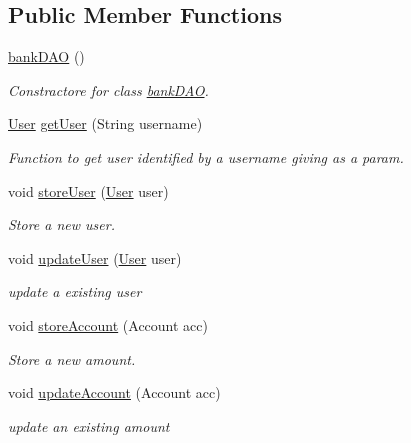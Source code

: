 \subsection*{Public Member Functions}
\begin{DoxyCompactItemize}
\item 
\mbox{\label{classbankapp_1_1server_1_1bankDAO_a974c7da6eea192fb2f94a98a66e5068a}} 
\hyperlink{classbankapp_1_1server_1_1bankDAO_a974c7da6eea192fb2f94a98a66e5068a}{bank\+D\+AO} ()
\begin{DoxyCompactList}\small\item\em Constractore for class \hyperlink{classbankapp_1_1server_1_1bankDAO}{bank\+D\+AO}. \end{DoxyCompactList}\item 
\hyperlink{classbankapp_1_1server_1_1User}{User} \hyperlink{classbankapp_1_1server_1_1bankDAO_af952db62263ca6ebda3130336e63f941}{get\+User} (String username)
\begin{DoxyCompactList}\small\item\em Function to get user identified by a username giving as a param. \end{DoxyCompactList}\item 
void \hyperlink{classbankapp_1_1server_1_1bankDAO_a2026e5f30e2342995dddfc654a37d640}{store\+User} (\hyperlink{classbankapp_1_1server_1_1User}{User} user)
\begin{DoxyCompactList}\small\item\em Store a new user. \end{DoxyCompactList}\item 
void \hyperlink{classbankapp_1_1server_1_1bankDAO_ab3ed5a9b972ea31ebc023596efecb2d1}{update\+User} (\hyperlink{classbankapp_1_1server_1_1User}{User} user)
\begin{DoxyCompactList}\small\item\em update a existing user \end{DoxyCompactList}\item 
void \hyperlink{classbankapp_1_1server_1_1bankDAO_a0023f065d21c23dd9b952339fd832d7e}{store\+Account} (Account acc)
\begin{DoxyCompactList}\small\item\em Store a new amount. \end{DoxyCompactList}\item 
void \hyperlink{classbankapp_1_1server_1_1bankDAO_a22f03ae02432bc82af70d212a7a8cdba}{update\+Account} (Account acc)
\begin{DoxyCompactList}\small\item\em update an existing amount \end{DoxyCompactList}\end{DoxyCompactItemize}


